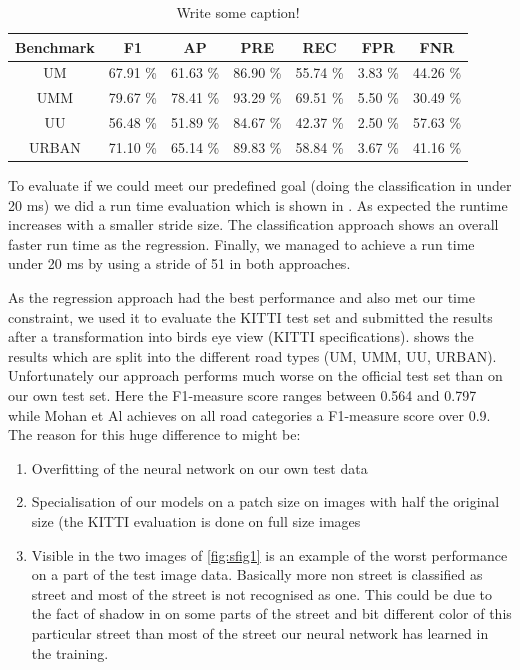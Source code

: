  
 
 
 
 \begin{table}[]
 	\begin{center}
 		\begin{tabular}{c|cccccc}
 			{\bf Benchmark} & {\bf F1} & {\bf AP} & {\bf PRE} & {\bf REC} & {\bf FPR} & {\bf FNR}\\ \hline
 			UM & 67.91 \% & 61.63 \% & 86.90 \% & 55.74 \% & 3.83 \% & 44.26 \%\\
 			UMM & 79.67 \% & 78.41 \% & 93.29 \% & 69.51 \% & 5.50 \% & 30.49 \%\\
 			UU  & 56.48 \% & 51.89 \% & 84.67 \% & 42.37 \% & 2.50 \% & 57.63 \%\\
 			URBAN & 71.10 \% & 65.14 \% & 89.83 \% & 58.84 \% & 3.67 \% & 41.16 \%\\
 		\end{tabular}
 	\end{center}
 	 		\caption{Write some caption!}
 	 		\label{tab:kitti}
 \end{table}
 
 

 



To evaluate if we could meet our predefined goal (doing the classification in under 20 ms) we did a run time evaluation which is shown in . As expected the runtime increases with a smaller stride size. The classification approach shows an overall faster run time as the regression. Finally, we managed to achieve a run time under 20 ms by using a stride of 51 in both approaches.





As the regression approach had the best performance and also met our time constraint, we used it to evaluate the KITTI test set and submitted the results after a transformation into birds eye view (KITTI specifications). shows the results which are split into the different road types (UM, UMM, UU, URBAN).
Unfortunately our approach performs much worse on the official test set than on our own test set. Here the F1-measure score ranges between 0.564 and 0.797 while Mohan et Al achieves on all road categories a F1-measure score over 0.9. The reason for this huge difference to might be: \\

\begin{enumerate}
  \item Overfitting of the neural network on our own test data
  \item Specialisation of our models on a patch size on images with half the original size (the KITTI evaluation is done on full size images
  \item Visible in the two images of \ref{fig:sfig1} is an example of the worst performance on a part of the test image data. Basically more non street is classified as street and most of the street is not recognised as one. This could be due to the fact of shadow in on some parts of the street and bit different color of this particular street than most of the street our neural network has learned in the training. 
  \end{enumerate}

